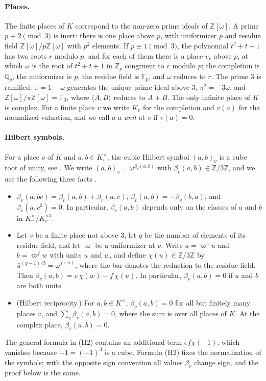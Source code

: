 \documentclass[11pt]{article}
\newcommand{\Z}{\mathbb{Z}}
\newcommand{\Q}{\mathbb{Q}}
\newcommand{\F}{\mathbb{F}}
\begin{document}
\paragraph{Places.} The finite places of $K$ correspond to the non-zero prime ideals of $\Z[\omega]$. A prime $p\equiv2\pmod3$ is inert: there is one place above $p$, with uniformizer $p$ and residue field $\Z[\omega]/p\Z[\omega]$ with $p^2$ elements. If $p\equiv1\pmod3$, the polynomial $t^2+t+1$ has two roots $r$ modulo $p$, and for each of them there is a place $v_r$ above $p$, at which $\omega$ is the root of $t^2+t+1$ in $\Z_p$ congruent to $r$ modulo $p$; the completion is $\Q_p$, the uniformizer is $p$, the residue field is $\F_p$, and $\omega$ reduces to $r$. The prime $3$ is ramified: $\pi=1-\omega$ generates the unique prime ideal above $3$, $\pi^2=-3\omega$, and $\Z[\omega]/\pi\Z[\omega]=\F_3$, where $\langle A,B\rangle$ reduces to $A+B$. The only infinite place of $K$ is complex. For a finite place $v$ we write $K_v$ for the completion and $v(a)$ for the normalized valuation, and we call $a$ a \emph{unit} at $v$ if $v(a)=0$.

\paragraph{Hilbert symbols.} For a place $v$ of $K$ and $a,b\in K_v^\times$, the cubic Hilbert symbol $(a,b)_v$ is a cube root of unity, see \cite[Chapter~V, \S3]{N}. We write $(a,b)_v=\omega^{\beta_v(a,b)}$ with $\beta_v(a,b)\in\Z/3\Z$, and we use the following three facts \cite[Chapter~V, \S3 and Chapter~VI, \S8]{N}.
\begin{itemize}
\item[(H1)] $\beta_v(a,bc)=\beta_v(a,b)+\beta_v(a,c)$, $\beta_v(a,b)=-\beta_v(b,a)$, and $\beta_v(a,c^3)=0$. In particular, $\beta_v(a,b)$ depends only on the classes of $a$ and $b$ in $K_v^\times/K_v^{\times3}$.
\item[(H2)] Let $v$ be a finite place not above $3$, let $q$ be the number of elements of its residue field, and let $\varpi$ be a uniformizer at $v$. Write $a=\varpi^eu$ and $b=\varpi^fw$ with units $u$ and $w$, and define $\chi(u)\in\Z/3\Z$ by $\bar u^{(q-1)/3}=\bar\omega^{\chi(u)}$, where the bar denotes the reduction to the residue field. Then $\beta_v(a,b)=e\,\chi(w)-f\,\chi(u)$. In particular, $\beta_v(a,b)=0$ if $a$ and $b$ are both units.
\item[(H3)] (Hilbert reciprocity.) For $a,b\in K^\times$, $\beta_v(a,b)=0$ for all but finitely many places $v$, and $\sum_v\beta_v(a,b)=0$, where the sum is over all places of $K$. At the complex place, $\beta_v(a,b)=0$.
\end{itemize}
The general formula in (H2) contains an additional term $ef\chi(-1)$, which vanishes because $-1=(-1)^3$ is a cube. Formula (H2) fixes the normalization of the symbols; with the opposite sign convention all values $\beta_v$ change sign, and the proof below is the same.
\end{document}
